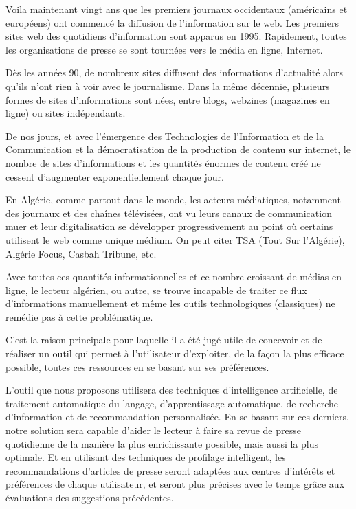 
Voila maintenant vingt ans que les premiers journaux occidentaux (américains et européens) ont commencé la diffusion de l'information sur le web. Les premiers sites web des quotidiens d'information sont apparus en 1995. Rapidement, toutes les organisations de presse se sont tournées vers le média en ligne, Internet.

Dès les années 90, de nombreux sites diffusent des informations d'actualité alors qu'ils n'ont rien à voir avec le journalisme. Dans la même décennie, plusieurs formes de sites d'informations sont nées, entre blogs, webzines (magazines en ligne) ou sites indépendants.

De nos jours, et avec l'émergence des Technologies de l'Information et de la Communication et la démocratisation de la production de contenu sur internet, le nombre de sites d'informations et les quantités énormes de contenu créé ne cessent d'augmenter exponentiellement chaque jour.

En Algérie, comme partout dans le monde, les acteurs médiatiques, notamment des journaux et des chaînes télévisées, ont vu leurs canaux de communication muer et leur digitalisation se développer progressivement au point où certains utilisent le web comme unique médium. On peut citer TSA (Tout Sur l'Algérie), Algérie Focus, Casbah Tribune, etc.

Avec toutes ces quantités informationnelles et ce nombre croissant de médias en ligne, le lecteur algérien, ou autre, se trouve incapable de traiter ce flux d'informations manuellement et même les outils technologiques (classiques) ne remédie pas à cette problématique. 

C'est la raison principale pour laquelle il a été jugé utile de concevoir et de réaliser un outil qui permet à l'utilisateur d'exploiter, de la façon la plus efficace possible, toutes ces ressources en se basant sur ses préférences.

L'outil que nous proposons utilisera des techniques d'intelligence artificielle, de traitement automatique du langage, d'apprentissage automatique, de recherche d'information et de recommandation personnalisée. En se basant sur ces derniers, notre solution sera capable d'aider le lecteur à faire sa revue de presse quotidienne de la manière la plus enrichissante possible, mais aussi la plus optimale. Et en utilisant des techniques de profilage intelligent, les recommandations d'articles de presse seront adaptées aux centres d'intérêts et préférences de chaque utilisateur, et seront plus précises avec le temps grâce aux évaluations des suggestions précédentes.

